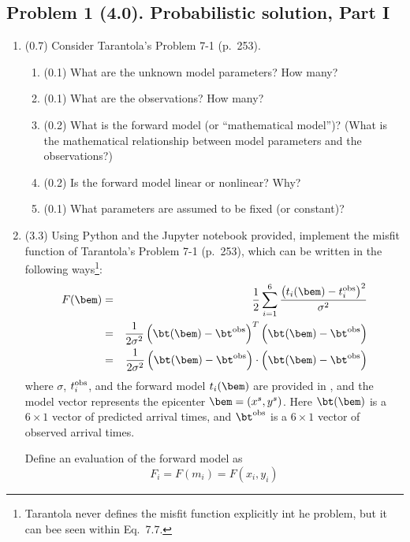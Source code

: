 \documentclass[11pt,titlepage,fleqn]{article}
\begin{document}

\pagebreak
\subsection*{Problem 1 (4.0). Probabilistic solution, Part I}

\begin{enumerate}
\item (0.7) Consider Tarantola's Problem 7-1 (p.~253).
%
\begin{enumerate}
\item (0.1) What are the unknown model parameters? How many?
\item (0.1) What are the observations? How many?
\item (0.2) What is the forward model (or ``mathematical model'')? (What is the mathematical relationship between model parameters and the observations?)
\item (0.2) Is the forward model linear or nonlinear? Why?
\item (0.1) What parameters are assumed to be fixed (or constant)?
\end{enumerate}


\item (3.3) Using Python and the Jupyter notebook provided, implement the misfit function of Tarantola's Problem 7-1 (p.~253), which can be written in the following ways\footnote{Tarantola never defines the misfit function explicitly int he problem, but it can bee seen within Eq.~7.7.}:
%
\begin{eqnarray}
F(\bem) &=& \frac{1}{2} \sum_{i=1}^6 \frac{\left(t_i(\bem) - t_i^{\rm obs}\right)^2}{\sigma^2}
\\
&=& \frac{1}{2\sigma^2} \left(\bt(\bem) - \bt^{\rm obs}\right)^T \left(\bt(\bem) - \bt^{\rm obs}\right)
\\
&=& \frac{1}{2\sigma^2} \left(\bt(\bem) - \bt^{\rm obs}\right) \cdot \left(\bt(\bem) - \bt^{\rm obs}\right)
\end{eqnarray}
%
where $\sigma$, $t_i^{\rm obs}$, and the forward model $t_i(\bem)$ are provided in \citet{Tarantola2005}, and the model vector represents the epicenter $\bem = (x^s,y^s)$. Here $\bt(\bem)$ is a $6 \times 1$ vector of predicted arrival times, and $\bt^{\rm obs}$ is a $6 \times 1$ vector of observed arrival times.

Define an evaluation of the forward model as
%
\begin{equation}
F_i = F(m_i) = F(x_i,y_i)
\end{equation}


\end{enumerate}
\end{document}
